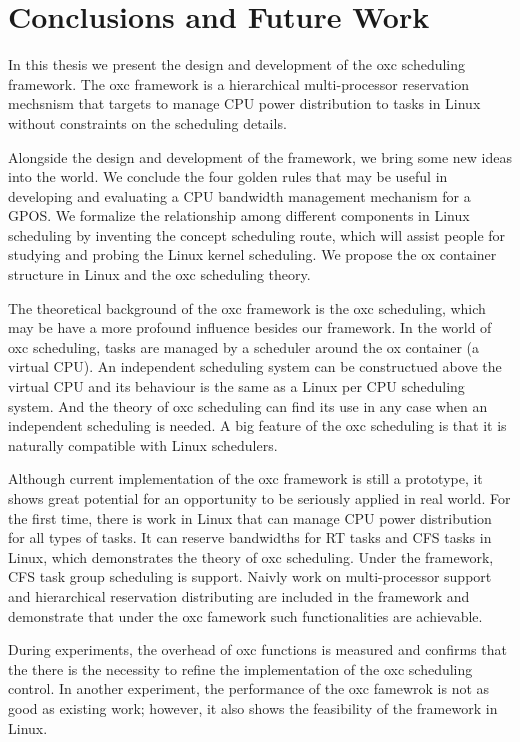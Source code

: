 \chapter{Conclusions and Future Work\label{chap:con}}
In this thesis we present the design and development of the oxc scheduling
framework. The oxc framework is a hierarchical multi-processor reservation 
mechsnism that targets to manage CPU power distribution to tasks in Linux
without constraints on the scheduling details. 

Alongside the design and development of the framework, we bring some
new ideas into the world. We conclude the four golden rules that may
be useful in developing and evaluating a CPU bandwidth management 
mechanism for a GPOS. We formalize the relationship among
different components in Linux scheduling by inventing the concept
scheduling route, which will assist people for studying and probing
the Linux kernel scheduling. We propose the ox container structure in 
Linux and the oxc scheduling theory. 

The theoretical background of the oxc framework is the oxc scheduling,
which may be have a more profound influence besides our framework. 
In the world of oxc scheduling, tasks are managed by a scheduler around 
the ox container (a virtual CPU). An independent scheduling system can 
be constructued above the virtual CPU and its behaviour is the same as a 
Linux per CPU scheduling system. And the theory of oxc scheduling can 
find its use in any case when an independent scheduling is needed. A big 
feature of the oxc scheduling is that it is naturally compatible with 
Linux schedulers. 

Although current implementation of the oxc framework is still a prototype,
it shows great potential for an opportunity to be seriously applied in real
world. For the first time, there is work in Linux that can manage CPU power
distribution for all types of tasks. It can reserve bandwidths for RT tasks
and CFS tasks in Linux, which demonstrates the theory of oxc scheduling. 
Under the framework, CFS task group scheduling is support.
Naivly work on multi-processor support and hierarchical reservation 
distributing are included in the framework and demonstrate that under 
the oxc famework such functionalities are achievable.  

During experiments, the overhead of oxc functions is measured and 
confirms that the there is the necessity to refine the implementation
of the oxc scheduling control. In another experiment, the performance of
the oxc famewrok is not as good as existing work; however, it also shows
the feasibility of the framework in Linux.

